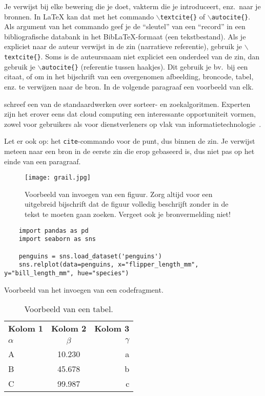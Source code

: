 Je verwijst bij elke bewering die je doet, vakterm die je introduceert, enz.\ naar je bronnen. In \LaTeX{} kan dat met het commando \texttt{$\backslash${textcite\{\}}} of \texttt{$\backslash${autocite\{\}}}. Als argument van het commando geef je de ``sleutel'' van een ``record'' in een bibliografische databank in het Bib\LaTeX{}-formaat (een tekstbestand). Als je expliciet naar de auteur verwijst in de zin (narratieve referentie), gebruik je \texttt{$\backslash${}textcite\{\}}. Soms is de auteursnaam niet expliciet een onderdeel van de zin, dan gebruik je \texttt{$\backslash${}autocite\{\}} (referentie tussen haakjes). Dit gebruik je bv.~bij een citaat, of om in het bijschrift van een overgenomen afbeelding, broncode, tabel, enz. te verwijzen naar de bron. In de volgende paragraaf een voorbeeld van elk.

\textcite{Knuth1998} schreef een van de standaardwerken over sorteer- en zoekalgoritmen. Experten zijn het erover eens dat cloud computing een interessante opportuniteit vormen, zowel voor gebruikers als voor dienstverleners op vlak van informatietechnologie~\autocite{Creeger2009}.

Let er ook op: het \texttt{cite}-commando voor de punt, dus binnen de zin. Je verwijst meteen naar een bron in de eerste zin die erop gebaseerd is, dus niet pas op het einde van een paragraaf.

\begin{figure}
  \centering
  \texttt{[image: grail.jpg]}
  \caption[Voorbeeld figuur.]{\label{fig:grail}Voorbeeld van invoegen van een figuur. Zorg altijd voor een uitgebreid bijschrift dat de figuur volledig beschrijft zonder in de tekst te moeten gaan zoeken. Vergeet ook je bronvermelding niet!}
\end{figure}

\begin{listing}
  \begin{verbatim}
    import pandas as pd
    import seaborn as sns

    penguins = sns.load_dataset('penguins')
    sns.relplot(data=penguins, x="flipper_length_mm", y="bill_length_mm", hue="species")
  \end{verbatim}
  \caption[Voorbeeld codefragment]{Voorbeeld van het invoegen van een codefragment.}
\end{listing}

\begin{table}
  \centering
  \begin{tabular}{lcr}
    \toprule
    \textbf{Kolom 1} & \textbf{Kolom 2} & \textbf{Kolom 3} \\
    $\alpha$         & $\beta$          & $\gamma$         \\
    \midrule
    A                & 10.230           & a                \\
    B                & 45.678           & b                \\
    C                & 99.987           & c                \\
    \bottomrule
  \end{tabular}
  \caption[Voorbeeld tabel]{\label{tab:example}Voorbeeld van een tabel.}
\end{table}

